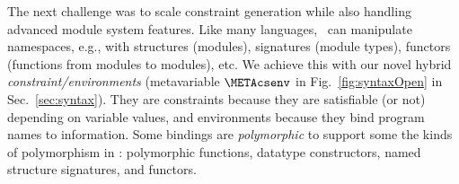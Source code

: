 \documentclass{jfp1}
\begin{document}
The next challenge was to scale constraint generation while also
handling advanced module system features.  Like many languages, \SML\
can manipulate namespaces, e.g., with structures (modules), signatures
(module types), functors (functions from modules to modules), etc.  We
achieve this with our novel hybrid \emph{constraint/environments}
(metavariable $\METAcsenv$ in Fig.~\ref{fig:syntaxOpen} in
Sec.~\ref{sec:syntax}).  They are constraints because they are
satisfiable (or not) depending on variable values, and environments
because they bind program names to information.
%
Some bindings are \emph{polymorphic} to support some the
kinds of polymorphism in \SML: polymorphic functions, datatype
constructors, named structure signatures, and functors.


\end{document}

